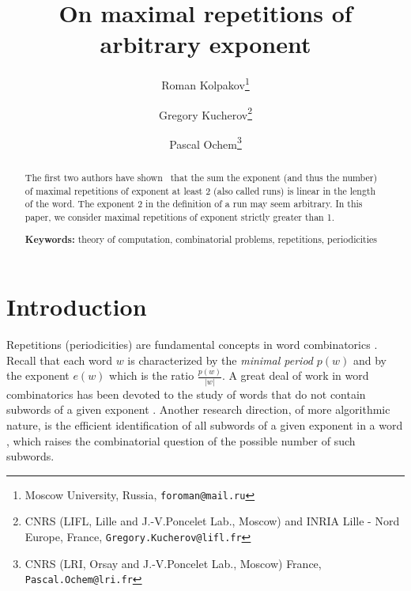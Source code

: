 \documentclass[11pt]{article}
\newcommand{\p}[1]{p({#1})}
\begin{document}

\title{On maximal repetitions of arbitrary exponent}

\author{Roman Kolpakov\thanks{Moscow University, Russia, {\tt foroman@mail.ru}}
\and Gregory Kucherov\thanks{CNRS (LIFL, Lille and J.-V.Poncelet Lab., Moscow) and INRIA Lille - Nord Europe, France, {\tt Gregory.Kucherov@lifl.fr}} 
\and Pascal Ochem\thanks{CNRS (LRI, Orsay and J.-V.Poncelet Lab., Moscow) France, {\tt Pascal.Ochem@lri.fr}}
}



\maketitle

\begin{abstract}
The first two authors have shown~\cite{KolpakovKucherovFCT99,KolpakovKucherovJDA00} that the sum the exponent (and thus the number) of
maximal repetitions of exponent at least 2 (also called runs) is linear in the length of the word.
The exponent 2 in the definition of a run may seem arbitrary. 
In this paper, we consider maximal repetitions of exponent strictly greater than 1.

{\bf Keywords:} theory of computation, combinatorial problems, repetitions, periodicities
\end{abstract}


\section{Introduction}

Repetitions (periodicities) are fundamental concepts in word
combinatorics \cite{Lothaire83,ChofKarh97handbook,KolpakovKucherovLothaire04}. Recall
that each word $w$ is characterized by the {\em minimal period}
$\p{w}$ and by the exponent $e(w)$ which is the ratio $\frac{\p{w}}{|w|}$. A
great deal of work in word combinatorics has been devoted to the study of
words that do not contain subwords of a given exponent
\cite{ChofKarh97handbook}. Another research direction, of more
algorithmic nature, is the efficient identification of all subwords of
a given exponent in a word \cite{KolpakovKucherovLothaire04}, which
raises the combinatorial question of the possible number of such
subwords. 
\end{document}
